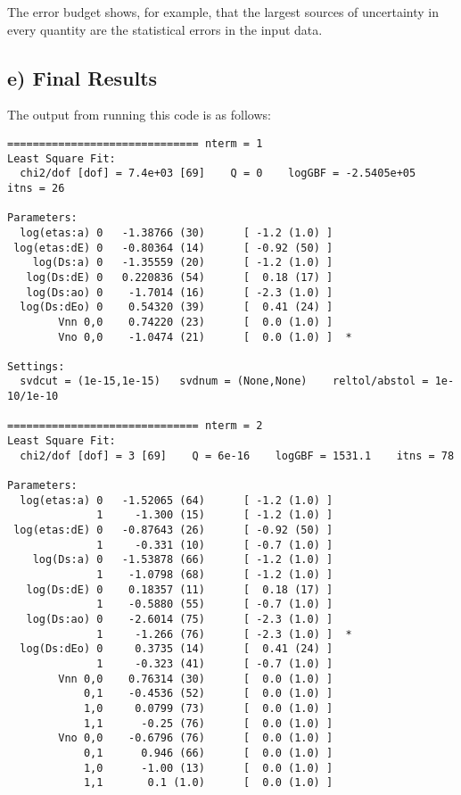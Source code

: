 \documentclass[letterpaper,10pt,english]{sphinxmanual}
\begin{document}
The error budget shows, for example, that the largest sources of uncertainty
in every quantity are the statistical errors in the input data.


\subsection{e) Final Results}
\label{corrfitter:e-final-results}
The output from running this code is as follows:

\begin{Verbatim}[commandchars=\\\{\}]
============================== nterm = 1
Least Square Fit:
  chi2/dof [dof] = 7.4e+03 [69]    Q = 0    logGBF = -2.5405e+05    itns = 26

Parameters:
  log(etas:a) 0   -1.38766 (30)      [ -1.2 (1.0) ]  
 log(etas:dE) 0   -0.80364 (14)      [ -0.92 (50) ]  
    log(Ds:a) 0   -1.35559 (20)      [ -1.2 (1.0) ]  
   log(Ds:dE) 0   0.220836 (54)      [  0.18 (17) ]  
   log(Ds:ao) 0    -1.7014 (16)      [ -2.3 (1.0) ]  
  log(Ds:dEo) 0    0.54320 (39)      [  0.41 (24) ]  
        Vnn 0,0    0.74220 (23)      [  0.0 (1.0) ]  
        Vno 0,0    -1.0474 (21)      [  0.0 (1.0) ]  *

Settings:
  svdcut = (1e-15,1e-15)   svdnum = (None,None)    reltol/abstol = 1e-10/1e-10

============================== nterm = 2
Least Square Fit:
  chi2/dof [dof] = 3 [69]    Q = 6e-16    logGBF = 1531.1    itns = 78

Parameters:
  log(etas:a) 0   -1.52065 (64)      [ -1.2 (1.0) ]  
              1     -1.300 (15)      [ -1.2 (1.0) ]  
 log(etas:dE) 0   -0.87643 (26)      [ -0.92 (50) ]  
              1     -0.331 (10)      [ -0.7 (1.0) ]  
    log(Ds:a) 0   -1.53878 (66)      [ -1.2 (1.0) ]  
              1    -1.0798 (68)      [ -1.2 (1.0) ]  
   log(Ds:dE) 0    0.18357 (11)      [  0.18 (17) ]  
              1    -0.5880 (55)      [ -0.7 (1.0) ]  
   log(Ds:ao) 0    -2.6014 (75)      [ -2.3 (1.0) ]  
              1     -1.266 (76)      [ -2.3 (1.0) ]  *
  log(Ds:dEo) 0     0.3735 (14)      [  0.41 (24) ]  
              1     -0.323 (41)      [ -0.7 (1.0) ]  
        Vnn 0,0    0.76314 (30)      [  0.0 (1.0) ]  
            0,1    -0.4536 (52)      [  0.0 (1.0) ]  
            1,0     0.0799 (73)      [  0.0 (1.0) ]  
            1,1      -0.25 (76)      [  0.0 (1.0) ]  
        Vno 0,0    -0.6796 (76)      [  0.0 (1.0) ]  
            0,1      0.946 (66)      [  0.0 (1.0) ]  
            1,0      -1.00 (13)      [  0.0 (1.0) ]  
            1,1       0.1 (1.0)      [  0.0 (1.0) ]  


\end{Verbatim}
\end{document}
